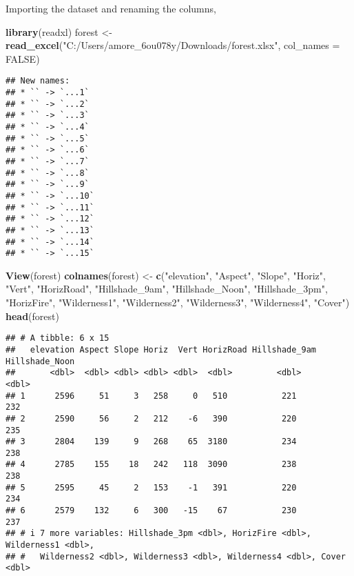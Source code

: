 \documentclass[12pt]{article}
\newenvironment{Shaded}{\begin{snugshade}}{\end{snugshade}}
\newcommand{\AttributeTok}[1]{\textcolor[rgb]{0.13,0.29,0.53}{#1}}
\newcommand{\ConstantTok}[1]{\textcolor[rgb]{0.56,0.35,0.01}{#1}}
\newcommand{\FunctionTok}[1]{\textcolor[rgb]{0.13,0.29,0.53}{\textbf{#1}}}
\newcommand{\NormalTok}[1]{#1}
\newcommand{\OtherTok}[1]{\textcolor[rgb]{0.56,0.35,0.01}{#1}}
\newcommand{\StringTok}[1]{\textcolor[rgb]{0.31,0.60,0.02}{#1}}
\begin{document}
\hspace{0.5cm}

Importing the dataset and renaming the columns,

\begin{Shaded}
\begin{Highlighting}[]
\FunctionTok{library}\NormalTok{(readxl)}
\NormalTok{forest }\OtherTok{\textless{}{-}} \FunctionTok{read\_excel}\NormalTok{(}\StringTok{"C:/Users/amore\_6ou078y/Downloads/forest.xlsx"}\NormalTok{, }
    \AttributeTok{col\_names =} \ConstantTok{FALSE}\NormalTok{)}
\end{Highlighting}
\end{Shaded}

\begin{verbatim}
## New names:
## * `` -> `...1`
## * `` -> `...2`
## * `` -> `...3`
## * `` -> `...4`
## * `` -> `...5`
## * `` -> `...6`
## * `` -> `...7`
## * `` -> `...8`
## * `` -> `...9`
## * `` -> `...10`
## * `` -> `...11`
## * `` -> `...12`
## * `` -> `...13`
## * `` -> `...14`
## * `` -> `...15`
\end{verbatim}

\begin{Shaded}
\begin{Highlighting}[]
\FunctionTok{View}\NormalTok{(forest)}
\FunctionTok{colnames}\NormalTok{(forest) }\OtherTok{\textless{}{-}} \FunctionTok{c}\NormalTok{(}\StringTok{"elevation"}\NormalTok{, }\StringTok{"Aspect"}\NormalTok{, }\StringTok{"Slope"}\NormalTok{, }\StringTok{"Horiz"}\NormalTok{, }\StringTok{"Vert"}\NormalTok{, }
        \StringTok{"HorizRoad"}\NormalTok{, }\StringTok{"Hillshade\_9am"}\NormalTok{, }\StringTok{"Hillshade\_Noon"}\NormalTok{, }\StringTok{"Hillshade\_3pm"}\NormalTok{, }
                \StringTok{"HorizFire"}\NormalTok{, }\StringTok{"Wilderness1"}\NormalTok{, }\StringTok{"Wilderness2"}\NormalTok{, }\StringTok{"Wilderness3"}\NormalTok{, }
                        \StringTok{"Wilderness4"}\NormalTok{, }\StringTok{"Cover"}\NormalTok{)}
\FunctionTok{head}\NormalTok{(forest)}
\end{Highlighting}
\end{Shaded}

\begin{verbatim}
## # A tibble: 6 x 15
##   elevation Aspect Slope Horiz  Vert HorizRoad Hillshade_9am Hillshade_Noon
##       <dbl>  <dbl> <dbl> <dbl> <dbl>  <dbl>         <dbl>          <dbl>
## 1      2596     51     3   258     0   510           221            232
## 2      2590     56     2   212    -6   390           220            235
## 3      2804    139     9   268    65  3180           234            238
## 4      2785    155    18   242   118  3090           238            238
## 5      2595     45     2   153    -1   391           220            234
## 6      2579    132     6   300   -15    67           230            237
## # i 7 more variables: Hillshade_3pm <dbl>, HorizFire <dbl>, Wilderness1 <dbl>,
## #   Wilderness2 <dbl>, Wilderness3 <dbl>, Wilderness4 <dbl>, Cover <dbl>
\end{verbatim}
\end{document}
